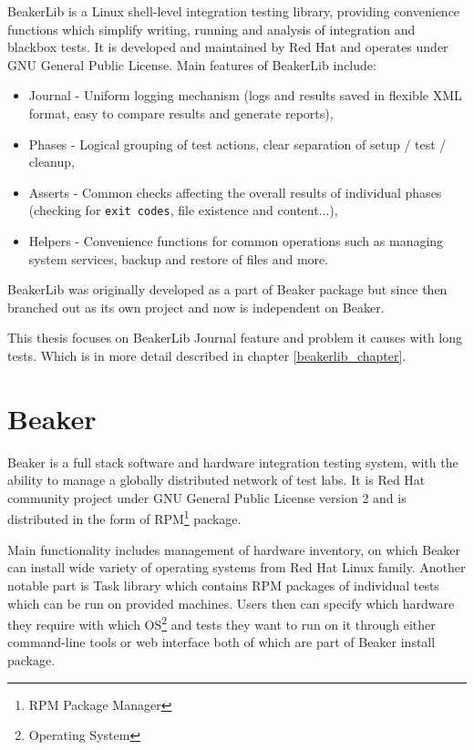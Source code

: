 BeakerLib is a Linux shell-level integration testing library, providing convenience functions which simplify writing, running and analysis of integration and blackbox tests\cite{beakerlib_wiki}.
It is developed and maintained by Red Hat and operates under GNU General Public License.
Main features of BeakerLib include:
\begin{itemize}
\item Journal - Uniform logging mechanism (logs and results saved in flexible XML format, easy to compare results and generate reports),
\item Phases - Logical grouping of test actions, clear separation of setup / test / cleanup,
\item Asserts - Common checks affecting the overall results of individual phases (checking for \texttt{exit codes}, file existence and content...),
\item Helpers - Convenience functions for common operations such as managing system services, backup and restore of files and more.
\end{itemize}

BeakerLib was originally developed as a part of Beaker package but since then branched out as its own project and now is independent on Beaker.

This thesis focuses on BeakerLib Journal feature and problem it causes with long tests. Which is in more detail described in chapter \ref{beakerlib_chapter}.

\section{Beaker}

Beaker is a full stack software and hardware integration testing system, with the ability to manage a globally distributed network of test labs\cite{beaker_doc}.  It is Red Hat community project under GNU General Public License version 2 and is distributed in the form of RPM\footnote{RPM Package Manager} package.

Main functionality includes management of hardware inventory, on which Beaker can install wide variety  of operating systems from Red Hat Linux family. Another notable part is Task library which contains RPM packages of individual tests which can be run on provided machines. 
Users then can specify which hardware they require with which OS\footnote{Operating System} and tests they want to run on it through either command-line tools or web interface both of which are part of Beaker install package. 

